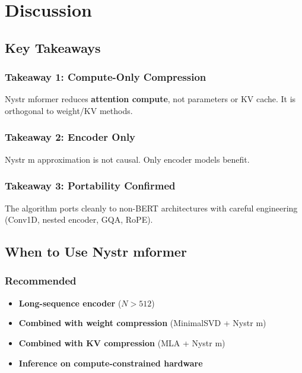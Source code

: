 
\section{Discussion}

\subsection{Key Takeaways}

\subsubsection{Takeaway 1: Compute-Only Compression}

Nystr mformer reduces \textbf{attention compute}, not parameters or KV cache. 
It is orthogonal to weight/KV methods.

\subsubsection{Takeaway 2: Encoder Only}

Nystr m approximation is not causal. Only encoder models benefit.

\subsubsection{Takeaway 3: Portability Confirmed}

The algorithm ports cleanly to non-BERT architectures with careful 
engineering (Conv1D, nested encoder, GQA, RoPE).

\subsection{When to Use Nystr mformer}

\subsubsection{Recommended}

\begin{itemize}
\item \textbf{Long-sequence encoder} ($N > 512$)
\item \textbf{Combined with weight compression} (MinimalSVD + Nystr m)
\item \textbf{Combined with KV compression} (MLA + Nystr m)
\item \textbf{Inference on compute-constrained hardware}

\end{itemize}
